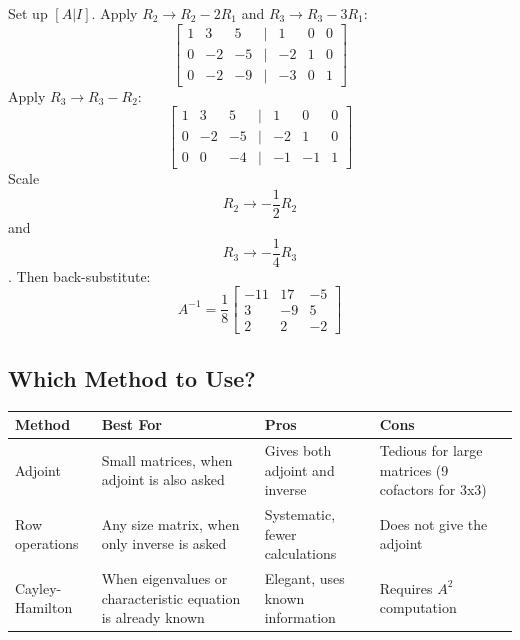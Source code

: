 \documentclass[
]{article}
\begin{document}
Set up \([A \lvert  I]\). Apply \(R_2 \to R_2 - 2R_1\) and
\(R_3 \to R_3 - 3R_1\):
\[
\begin{bmatrix}
1 & 3 & 5 & | & 1 & 0 & 0 \\
0 & -2 & -5 & | & -2 & 1 & 0 \\
0 & -2 & -9 & | & -3 & 0 & 1
\end{bmatrix}
\]
Apply \(R_3 \to R_3 - R_2\):
\[
\begin{bmatrix}
1 & 3 & 5 & | & 1 & 0 & 0 \\
0 & -2 & -5 & | & -2 & 1 & 0 \\
0 & 0 & -4 & | & -1 & -1 & 1
\end{bmatrix}
\]
Scale
\[
R_2 \to -\frac{1}{2}R_2
\]
and
\[
R_3 \to -\frac{1}{4}R_3
\]
. Then back-substitute:
\[
A^{-1} = \frac{1}{8}
\begin{bmatrix}
-11 & 17 & -5 \\
3 & -9 & 5 \\
2 & 2 & -2
\end{bmatrix}
\]

\subsection{Which Method to Use?}\label{which-method-to-use}

\begin{longtable}[]{@{}
  >{\raggedright\arraybackslash}p{}
  >{\raggedright\arraybackslash}p{}
  >{\raggedright\arraybackslash}p{}
  >{\raggedright\arraybackslash}p{}@{}}
\toprule\noalign{}
\begin{minipage}[b]{\linewidth}\raggedright
Method
\end{minipage} & \begin{minipage}[b]{\linewidth}\raggedright
Best For
\end{minipage} & \begin{minipage}[b]{\linewidth}\raggedright
Pros
\end{minipage} & \begin{minipage}[b]{\linewidth}\raggedright
Cons
\end{minipage} \\
\midrule\noalign{}
\endhead
\bottomrule\noalign{}
\endlastfoot
Adjoint & Small matrices, when adjoint is also asked & Gives both
adjoint and inverse & Tedious for large matrices (9 cofactors for
3x3) \\
Row operations & Any size matrix, when only inverse is asked &
Systematic, fewer calculations & Does not give the adjoint \\
Cayley-Hamilton & When eigenvalues or characteristic equation is already
known & Elegant, uses known information & Requires \(A^2\)
computation \\
\end{longtable}
\end{document}
